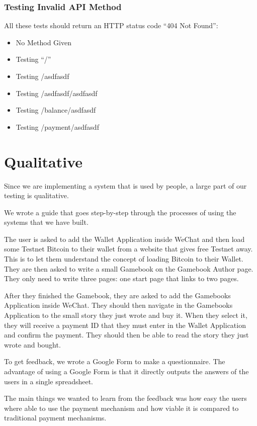 \subsubsection{Testing Invalid API Method}

All these tests should return an HTTP status code ``404 Not Found'':

\begin{itemize}
	\item No Method Given
	\item Testing ``/''
	\item Testing /asdfasdf
	\item Testing /asdfasdf/asdfasdf
	\item Testing /balance/asdfasdf
	\item Testing /payment/asdfasdf
\end{itemize}	

	
\section{Qualitative}

Since we are implementing a system that is used by people, a large part of our testing is qualitative.

We wrote a guide that goes step-by-step through the processes of using the systems that we have built.

The user is asked to add the Wallet Application inside WeChat and then load some Testnet Bitcoin to their wallet from a website that gives free Testnet away. This is to let them understand the concept of loading Bitcoin to their Wallet. They are then asked to write a small Gamebook on the Gamebook Author page. They only need to write three pages: one start page that links to two pages.

After they finished the Gamebook, they are asked to add the Gamebooks Application inside WeChat. They should then navigate in the Gamebooks Application to the small story they just wrote and buy it. When they select it, they will receive a payment ID that they must enter in the Wallet Application and confirm the payment. They should then be able to read the story they just wrote and bought.

To get feedback, we wrote a Google Form to make a questionnaire. The advantage of using a Google Form is that it directly outputs the answers of the users in a single spreadsheet.

The main things we wanted to learn from the feedback was how easy the users where able to use the payment mechanism and how viable it is compared to traditional payment mechanisms.


